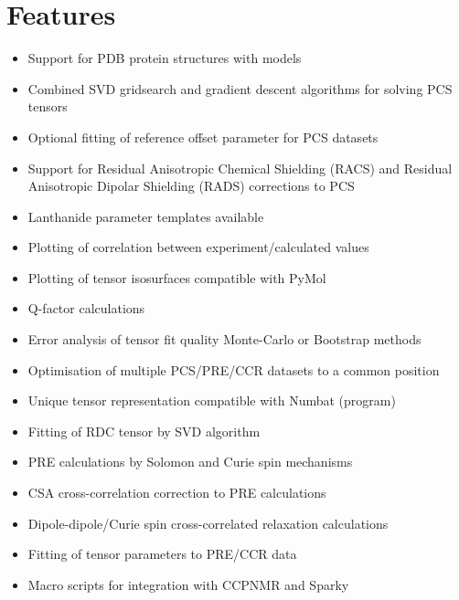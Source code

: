 \documentclass[a4paper,10pt,english,openany,oneside]{sphinxmanual}
\begin{document}
\chapter{Features}
\label{\detokenize{index:features}}\begin{itemize}
\item {} 
Support for PDB protein structures with models

\item {} 
Combined SVD gridsearch and gradient descent algorithms for solving PCS tensors

\item {} 
Optional fitting of reference offset parameter for PCS datasets

\item {} 
Support for Residual Anisotropic Chemical Shielding (RACS) and Residual Anisotropic Dipolar Shielding (RADS) corrections to PCS

\item {} 
Lanthanide parameter templates available

\item {} 
Plotting of correlation between experiment/calculated values

\item {} 
Plotting of tensor isosurfaces compatible with PyMol

\item {} 
Q-factor calculations

\item {} 
Error analysis of tensor fit quality Monte-Carlo or Bootstrap methods

\item {} 
Optimisation of multiple PCS/PRE/CCR datasets to a common position

\item {} 
Unique tensor representation compatible with Numbat (program)

\item {} 
Fitting of RDC tensor by SVD algorithm

\item {} 
PRE calculations by Solomon and Curie spin mechanisms

\item {} 
CSA cross-correlation correction to PRE calculations

\item {} 
Dipole-dipole/Curie spin cross-correlated relaxation calculations

\item {} 
Fitting of tensor parameters to PRE/CCR data

\item {} 
Macro scripts for integration with CCPNMR and Sparky

\end{itemize}
\end{document}
